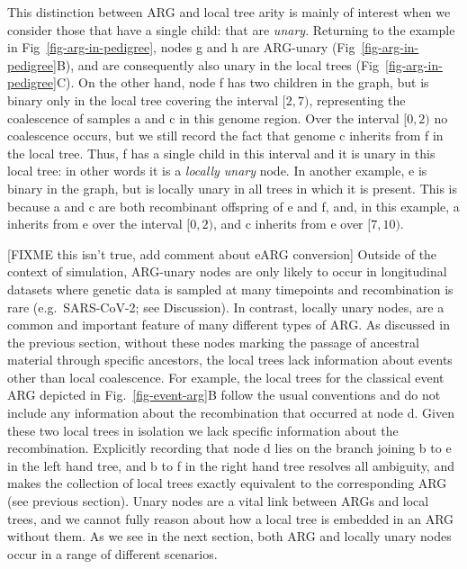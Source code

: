 \documentclass{article}
\newcommand{\noderef}[1]{\textsf{#1}}
\begin{document}
This distinction between ARG and local tree arity is mainly
of interest when we consider those that have
a single child: that are \emph{unary}.
Returning to the example in Fig~\ref{fig-arg-in-pedigree}, nodes
\noderef{g} and \noderef{h}
are ARG-unary (Fig~\ref{fig-arg-in-pedigree}B), and are consequently
also unary in the local trees (Fig~\ref{fig-arg-in-pedigree}C).
On the other hand, node \noderef{f} has two children
in the graph, but is binary only
in the local tree covering the interval $[2, 7)$,
representing the coalescence of samples \noderef{a} and \noderef{c}
in this genome region. Over the interval $[0, 2)$ no coalescence occurs,
but we still record the fact that genome \noderef{c} inherits from \noderef{f}
in the local tree. Thus, \noderef{f} has a single child in this
interval and it is unary in this local tree: in other words it is a \emph{locally unary} node.
In another example, \noderef{e} is binary in the graph, but is
locally unary in all trees in which it is present.
This is because \noderef{a} and \noderef{c} are both recombinant
offspring of \noderef{e} and \noderef{f}, and,
in this example,
\noderef{a} inherits from
\noderef{e} over the interval $[0, 2)$,
and \noderef{c} inherits from \noderef{e} over $[7, 10)$.

[FIXME this isn't true, add comment about eARG conversion]
Outside of the context of simulation, ARG-unary nodes are
only likely to occur in longitudinal datasets where genetic
data is sampled at many timepoints and recombination
is rare (e.g.~SARS-CoV-2; see Discussion).
In contrast, locally unary nodes, are a common and important feature
of many different types of ARG.
As discussed in the previous section,
without these nodes marking the passage
of ancestral material through specific ancestors, the local trees
lack information about events other than local coalescence.
For example, the local trees for the classical event ARG
depicted in Fig.~\ref{fig-event-arg}B follow the usual conventions
and do not include any information about the recombination
that occurred at node \noderef{d}. Given these two local trees
in isolation
we lack specific information about the recombination.
Explicitly recording that node \noderef{d} lies on the
branch joining \noderef{b} to \noderef{e} in the left hand
tree, and \noderef{b} to \noderef{f} in the right hand tree
resolves all ambiguity, and makes the collection of local
trees exactly equivalent to the corresponding ARG (see previous section).
Unary nodes are a vital link between ARGs and local trees, and we
cannot fully reason about how a local tree is embedded in an ARG
without them. As we see in the next section, both ARG and locally
unary nodes occur in a range of different scenarios.
\end{document}
